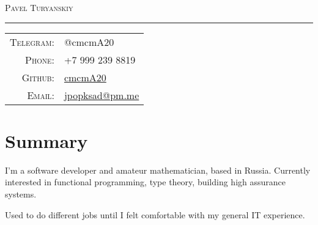\documentclass[a4paper,11pt]{article}
\begin{document}
  \begin{center}
    \Huge \textsc{Pavel Turyanskiy}
  \end{center}

  \hrule
  \vspace{0.5em}

  \begin{tabular}{rl}
    \textsc{Telegram:} & @cmcmA20                                      \\
    \textsc{Phone:}    & +7 999 239 8819                               \\
    \textsc{Github:}   & \href{https://github.com/cmcmA20}{cmcmA20}    \\
    \textsc{Email:}    & \href{mailto:jpopksad@pm.me}{jpopksad@pm.me}  \\
  \end{tabular}

  \section{Summary}
    I'm a software developer and amateur mathematician, based in Russia. Currently interested in functional
    programming, type theory, building high assurance systems.

    Used to do different jobs until I felt comfortable with my general IT experience.
\end{document}

